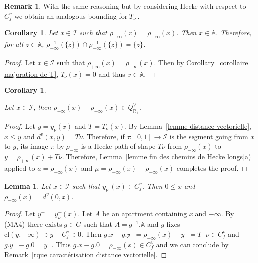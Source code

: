 \documentclass[12pt]{article}
\theoremstyle{plain}
\newtheorem{corollary}[theorem]{Corollary}
\newtheorem{lemma}[theorem]{Lemma}
\theoremstyle{definition}
\newtheorem{rque}[theorem]{Remark}
\newcommand{\R}{\mathbb{R}}
\newcommand{\A}{\mathbb{A}}
\newcommand{\I}{\mathcal{I}}
\begin{document}
\begin{rque}\label{rque majoration de T^-}
With the same reasoning but by considering Hecke with respect to $C^v_f$ we obtain an analogous bounding for $T_\nu^-$.
\end{rque}

\begin{corollary}\label{cor points ayant meme image par les rétractions}
 Let $x\in\mathcal{I}$ such that $\rho_{+\infty}(x)=\rho_{-\infty}(x)$. Then $x\in \mathbb{A}$. Therefore, for all  $z\in \mathbb{A}$, $\rho_{+\infty}^{-1}(\{z\})\cap\rho_{-\infty}^{-1}(\{z\})=\{z\}$.
\end{corollary}


\begin{proof}  Let $x\in\mathcal{I}$ such that $\rho_{+\infty}(x)=\rho_{-\infty}(x)$. Then by Corollary~\ref{corollaire majoration de T}, $T_\nu(x)=0$ and thus $x\in\A$.   
\end{proof}

\begin{corollary}\label{rque condition sur mu}

 Let $x\in \mathcal{I}$, then $\rho_{-\infty}(x)-\rho_{+\infty}(x)\in Q^\vee_{\R_+}$.
\end{corollary}

\begin{proof} Let $y=y_\nu(x)$ and $T=T_\nu(x)$. By Lemma~\ref{lemme distance vectorielle},  $x\leq y$ and $d^v(x,y)=T\nu$. Therefore, if $\tau:[0,1]\rightarrow \I$ is the segment going from $x$ to $y$,  its image $\pi$ by $\rho_{-\infty}$ is a Hecke path of shape $T\nu$ from $\rho_{-\infty}(x)$ to $y=\rho_{+\infty}(x)+T\nu$. Therefore, Lemma~\ref{lemme fin des chemins de Hecke longs}a) applied to $a=\rho_{-\infty}(x)$ and $\mu=\rho_{-\infty}(x)-\rho_{+\infty}(x)$ completes the proof.  

\end{proof}





\begin{lemma}\label{lemme_rétraction et distance vectorielle}
Let $x\in \mathcal{I}$ such that $y_\nu^-(x)\in C^v_f$. Then $0\leq x$ and $\rho_{-\infty}(x)=d^v(0,x)$.
\end{lemma}

\begin{proof} Let $y^-=y^-_\nu(x)$. Let $A$ be an apartment containing $x$ and $-\infty$. By (MA4) there exists $g\in G$ such that $A=g^{-1}.\A$ and $g$ fixes $\mathrm{cl}(y,-\infty)\supset y-\overline{C_f^v}\ni 0$. Then $g.x-g.y^-=\rho_{-\infty}(x)-y^-=T^-\nu\in C_f^v$ and $g.y^--g.0=y^-$. Thus $g.x-g.0=\rho_{-\infty}(x)\in C_f^v$ and we can conclude by Remark~\ref{rque caractérisation distance vectorielle}.  
\end{proof}
\end{document}

